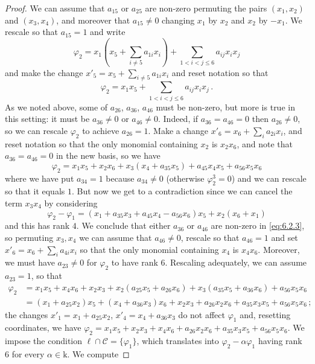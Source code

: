 \documentclass[10pt,reqno]{amsart}
\newcommand{\cC}{{\mathcal{C}}}
\renewcommand{\a}{\alpha}
\newcommand{\f}{\varphi}
\newcommand{\kk}{\mathrm{k}}
\theoremstyle{definition}
\begin{document}
\begin{proof}
\item We can assume that $a_{15}$ or $a_{25}$ are non-zero permuting the pairs $(x_1, x_2)$ and $(x_3, x_4)$, and moreover that $a_{15} \ne 0$ changing $x_1$ by $x_2$ and $x_2$ by $-x_1$. We rescale so that $a_{15}=1$ and write
\[
\f_2=x_1( x_5 + \textstyle{\sum_{i\ne 5} a_{1i} x_i}) + \textstyle{\sum_{1<i<j\leq 6} a_{ij}x_ix_j}
\]
and make the change $x'_5=x_5 + \sum_{i\neq 5} a_{1i} x_i$ and reset notation so that 
\begin{equation}\label{eq:6.2.3}
\f_2=x_1x_5 + \textstyle{\sum_{1<i<j\leq 6} a_{ij}x_ix_j}\,.    
\end{equation}
As we noted above, some of $a_{26}$, $a_{36}$, $a_{46}$ must be non-zero, but more is true in this setting: it must be $a_{36} \ne 0$ or $a_{46} \ne 0$. Indeed, if $a_{36}=a_{46}=0$ then $a_{26} \ne 0$, so we can rescale $\f_2$ to achieve $a_{26}=1$. Make a change $x'_6=x_6+\sum_i a_{2i} x_i$, and reset notation so that the only monomial containing $x_2$ is $x_2x_6$, and note that $a_{36}=a_{46}=0$ in the new basis, so we have
\[
\f_2=x_1x_5 + x_2 x_6 + x_3(x_4+a_{35}x_5) + a_{45}x_4x_5 + a_{56}x_5x_6
\]
where we have put $a_{34}=1$ because $a_{34} \ne 0$ (otherwise $\f_2^3=0$) and we can rescale so that it equals $1$. 
But now we get to a contradiction since we can cancel the term $x_3x_4$ by considering
\[
\f_2-\f_1=(x_1+a_{35}x_3+a_{45}x_4-a_{56}x_6)x_5 + x_2(x_6+x_1)
\]
and this has rank $4$. We conclude that either $a_{36}$ or $a_{46}$ are non-zero in \eqref{eq:6.2.3}, so permuting $x_3, x_4$ we can assume that $a_{46} \ne 0$, rescale so that $a_{46}=1$ and set $x'_6=x_6+ \sum_i a_{4i} x_i$ so that the only monomial containing $x_4$ is $x_4x_6$. Moreover, we must have $a_{23}\neq 0$ for $\f_2$ to have rank 6. Rescaling adequately, we can assume $a_{23}=1$, so that
\begin{align*}
\f_2&=x_1x_5 + x_4 x_6 + x_2x_3 + x_2(a_{25}x_5+a_{26}x_6) + x_3(a_{35}x_5+a_{36}x_6) + a_{56}x_5x_6\\
&=(x_1+a_{25}x_2)x_5 + (x_4+a_{36}x_3) x_6 + x_2x_3 + a_{26}x_2x_6 + a_{35} x_3x_5 + a_{56}x_5x_6\,;
\end{align*}
the changes $x'_1=x_1+a_{25}x_2$, $x'_4=x_4+a_{36}x_3$ do not affect $\f_1$ and, resetting coordinates, we have $\f_2=x_1x_5 + x_2x_3 + x_4x_6 + a_{26}x_2x_6 + a_{35} x_3x_5 + a_{56}x_5x_6$. We impose the condition $\ell\cap\cC=\{\f_1\}$, which translates into $\f_2-\a\f_1$ having rank $6$ for every $\a \in \kk$. We compute

\end{proof}
\end{document}
